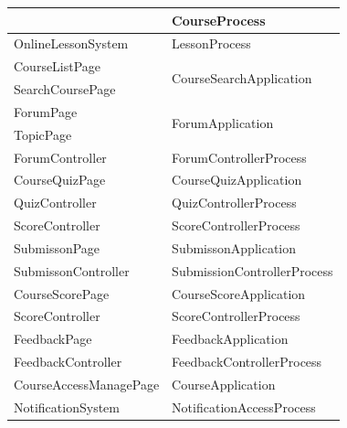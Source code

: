 \documentclass[./../main.tex]{subfiles}
\begin{document}
\begin{longtable}{|p{}|p{}|}
	                                                & CourseProcess                                    \\ \hline
	OnlineLessonSystem                              & LessonProcess                                    \\ \hline
	CourseListPage                                  & \multirow{2}{*}{CourseSearchApplication}         \\
	SearchCoursePage                                &                                                  \\ \hline
	ForumPage                                       & \multirow{2}{*}{ForumApplication}                \\
	TopicPage                                       &                                                  \\ \hline
	ForumController                                 & ForumControllerProcess                           \\ \hline
	CourseQuizPage                                  & CourseQuizApplication                            \\ \hline
	QuizController                                  & QuizControllerProcess                            \\ \hline
	ScoreController                                 & ScoreControllerProcess                           \\ \hline
	SubmissonPage                                   & SubmissonApplication                             \\ \hline
	SubmissonController                             & SubmissionControllerProcess                      \\ \hline
	CourseScorePage                                 & CourseScoreApplication                           \\ \hline
	ScoreController                                 & ScoreControllerProcess                           \\ \hline
	FeedbackPage                                    & FeedbackApplication                              \\ \hline
	FeedbackController                              & FeedbackControllerProcess                        \\ \hline
	CourseAccessManagePage                          & CourseApplication                                \\ \hline
	NotificationSystem                              & NotificationAccessProcess                        \\ \hline

\end{longtable}
\end{document}

